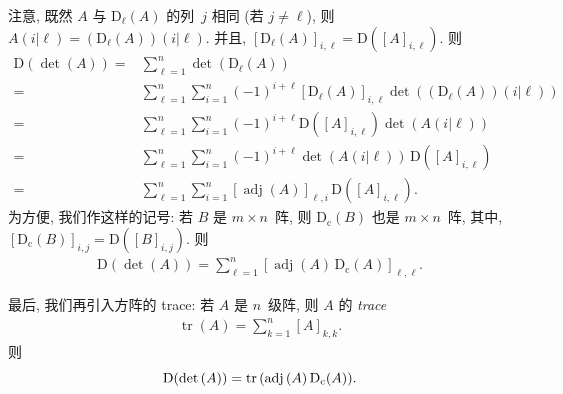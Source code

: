 \documentclass[../libro.tex]{subfiles}
\begin{document}
\begin{example}
    注意, 既然 \(A\) 与 \(\mathrm{D}_\ell (A)\)
    的列~\(j\) 相同 (若 \(j \neq \ell\)),
    则 \(A(i|\ell) = (\mathrm{D}_\ell (A))(i|\ell)\).
    并且,
    \([\mathrm{D}_\ell (A)]_{i,\ell} = \mathrm{D} ([A]_{i,\ell})\).
    则
    \begin{align*}
        \mathrm{D} (\det {(A)})
        = {} &
        \sum_{\ell = 1}^{n} {\det {(\mathrm{D}_\ell (A))}}
        \\
        = {} &
        \sum_{\ell = 1}^{n} {
            \sum_{i = 1}^{n} {
                (-1)^{i+\ell} [\mathrm{D}_\ell (A)]_{i,\ell}
                \det {((\mathrm{D}_\ell (A))(i|\ell))}
            }
        }
        \\
        = {} &
        \sum_{\ell = 1}^{n} {
            \sum_{i = 1}^{n} {
                (-1)^{i+\ell} \mathrm{D} ([A]_{i,\ell})
                \det {(A(i|\ell))}
            }
        }
        \\
        = {} &
        \sum_{\ell = 1}^{n} {
            \sum_{i = 1}^{n} {
                (-1)^{i+\ell}
                \det {(A(i|\ell))}\,
                \mathrm{D} ([A]_{i,\ell})
            }
        }
        \\
        = {} &
        \sum_{\ell = 1}^{n} {
            \sum_{i = 1}^{n} {
                [\operatorname{adj} {(A)}]_{\ell,i}\,
                \mathrm{D} ([A]_{i,\ell})
            }
        }.
    \end{align*}
    为方便, 我们作这样的记号:
    若 \(B\) 是 \(m \times n\)~阵,
    则 \(\mathrm{D}_{\mathrm{c}} (B)\) 也是 \(m \times n\)~阵,
    其中,
    \([\mathrm{D}_{\mathrm{c}} (B)]_{i,j} = \mathrm{D} ([B]_{i,j})\).
    则
    \begin{align*}
        \mathrm{D} (\det {(A)})
        = \sum_{\ell = 1}^{n}
        {[\operatorname{adj} {(A)}\,
        \mathrm{D}_{\mathrm{c}} (A)]_{\ell,\ell}}.
    \end{align*}

    最后, 我们再引入方阵的 trace:
    若 \(A\) 是 \(n\)~级阵, 则 \(A\) 的 \emph{trace}
    \begin{align*}
        \operatorname{tr} {(A)} = \sum_{k = 1}^{n} {[A]_{k,k}}.
    \end{align*}
    则
    \begin{equation*}
        \mathrm{D} (\det {(A)})
        = \operatorname{tr} {(\operatorname{adj} {(A)}\,
        \mathrm{D}_{\mathrm{c}} (A))}.
        \qedhere
    \end{equation*}
\end{example}
\end{document}
